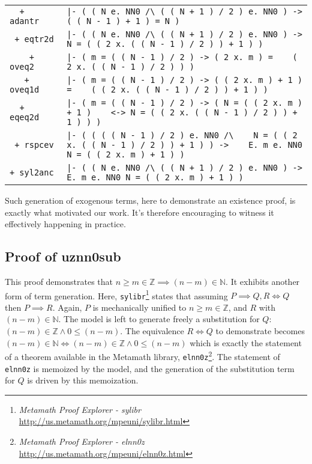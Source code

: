\documentclass{article}
\begin{document}
\begin{tabular}{ |l|p{105mm}| }
\verb|  + adantr    | & \verb!|- ( ( N e. NN0 /\ ( ( N + 1 ) / 2 ) e. NN0 ) -> !\newline\verb!   ( ( N - 1 ) + 1 ) = N )! \\
\verb| + eqtr2d     | & \verb!|- ( ( N e. NN0 /\ ( ( N + 1 ) / 2 ) e. NN0 ) -> !\newline\verb!   N = ( ( 2 x. ( ( N - 1 ) / 2 ) ) + 1 ) )! \\
\verb|    + oveq2   | & \verb!|- ( m = ( ( N - 1 ) / 2 ) -> ( 2 x. m ) = !\newline\verb!   ( 2 x. ( ( N - 1 ) / 2 ) ) )! \\
\verb|   + oveq1d   | & \verb!|- ( m = ( ( N - 1 ) / 2 ) -> ( ( 2 x. m ) + 1 ) = !\newline\verb!   ( ( 2 x. ( ( N - 1 ) / 2 ) ) + 1 ) )! \\
\verb|  + eqeq2d    | & \verb!|- ( m = ( ( N - 1 ) / 2 ) -> ( N = ( ( 2 x. m ) + 1 ) !\newline\verb!   <-> N = ( ( 2 x. ( ( N - 1 ) / 2 ) ) + 1 ) ) )! \\
\verb| + rspcev     | & \verb!|- ( ( ( ( N - 1 ) / 2 ) e. NN0 /\ !\newline\verb!   N = ( ( 2 x. ( ( N - 1 ) / 2 ) ) + 1 ) ) -> !\newline\verb!   E. m e. NN0 N = ( ( 2 x. m ) + 1 ) )! \\
\verb|+ syl2anc     | & \verb!|- ( ( N e. NN0 /\ ( ( N + 1 ) / 2 ) e. NN0 ) -> !\newline\verb!   E. m e. NN0 N = ( ( 2 x. m ) + 1 ) )! \\
\hline
\end{tabular}

Such generation of exogenous terms, here to demonstrate an existence proof, is exactly what motivated our work. It's therefore encouraging to witness it effectively happening in practice.

\subsection{Proof of \textbf{uznn0sub}}

This proof demonstrates that $n \ge m \in \mathbb{Z} \implies (n-m) \in \mathbb{N}$. It exhibits another form of term generation. Here, \verb|sylibr|\footnote{\textit{Metamath Proof Explorer - sylibr} \url{http://us.metamath.org/mpeuni/sylibr.html}} states that assuming $P \implies Q, R \Leftrightarrow Q$ then $P \implies R$. Again, $P$ is mechanically unified to $n \ge m \in \mathbb{Z}$, and $R$ with $(n-m) \in \mathbb{N}$. The model is left to generate freely a substitution for $Q$: $(n-m) \in \mathbb{Z} \land 0 \le (n-m)$. The equivalence $R \Leftrightarrow Q$ to demonstrate becomes $(n-m) \in \mathbb{N} \Leftrightarrow (n-m) \in \mathbb{Z} \land 0 \le (n-m)$ which is exactly the statement of a theorem available in the Metamath library, \verb|elnn0z|\footnote{\textit{Metamath Proof Explorer - elnn0z} \url{http://us.metamath.org/mpeuni/elnn0z.html}}. The statement of \verb|elnn0z| is memoized by the model, and the generation of the substitution term for $Q$ is driven by this memoization.
\end{document}
